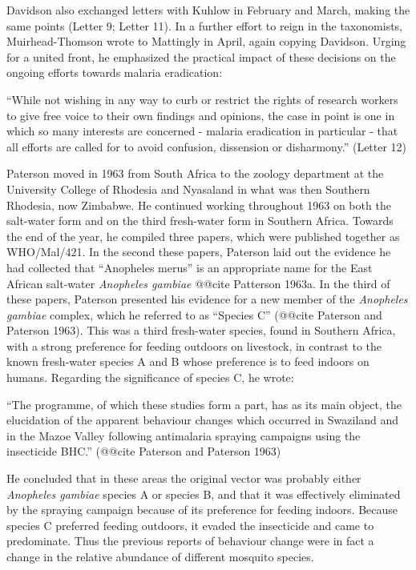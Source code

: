 \documentclass[a4paper,11pt,abstracton,hidelinks]{scrartcl}
\begin{document}
Davidson also exchanged letters with Kuhlow in February and March, making the same points (Letter 9; Letter 11). In a further effort to reign in the taxonomists, Muirhead-Thomson wrote to Mattingly in April, again copying Davidson. Urging for a united front, he emphasized the practical impact of these decisions on the ongoing efforts towards malaria eradication:


\begin{displayquote}
``While not wishing in any way to curb or restrict the rights of research workers to give free voice to their own findings and opinions, the case in point is one in which so many interests are concerned - malaria eradication in particular - that all efforts are called for to avoid confusion, dissension or disharmony.'' (Letter 12)
\end{displayquote}


Paterson moved in 1963 from South Africa to the zoology department at the University College of Rhodesia and Nyasaland in what was then Southern Rhodesia, now Zimbabwe. He continued working throughout 1963 on both the salt-water form and on the third fresh-water form in Southern Africa. Towards the end of the year, he compiled three papers, which were published together as WHO/Mal/421. In the second these papers, Paterson laid out the evidence he had collected that ``Anopheles merus'' is an appropriate name for the East African salt-water \textit{Anopheles gambiae} @@cite Patterson 1963a. In the third of these papers, Paterson presented his evidence for a new member of the \textit{Anopheles gambiae} complex, which he referred to as ``Species C'' (@@cite Paterson and Paterson 1963). This was a third fresh-water species, found in Southern Africa, with a strong preference for feeding outdoors on livestock, in contrast to the known fresh-water species A and B whose preference is to feed indoors on humans. Regarding the significance of species C, he wrote:


\begin{displayquote}
``The programme, of which these studies form a part, has as its main object, the elucidation of the apparent behaviour changes which occurred in Swaziland and in the Mazoe Valley following antimalaria spraying campaigns using the insecticide BHC.'' (@@cite Paterson and Paterson 1963)
\end{displayquote}


He concluded that in these areas the original vector was probably either \textit{Anopheles gambiae} species A or species B, and that it was effectively eliminated by the spraying campaign because of its preference for feeding indoors. Because species C preferred feeding outdoors, it evaded the insecticide and came to predominate. Thus the previous reports of behaviour change were in fact a change in the relative abundance of different mosquito species.
\end{document}
